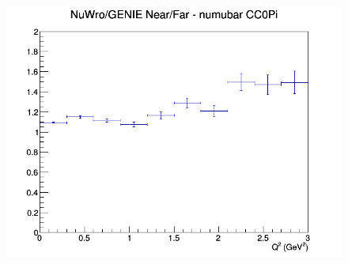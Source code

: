 \begin{figure}[h]
\endminipage
{}
\includegraphics[width=\linewidth]{eff_Q2/FGT/ratios/CC0Pi_NuWro_GENIE_numubar_NF_Q2.png}
\endminipage
\newline
\end{figure}
\clearpage
